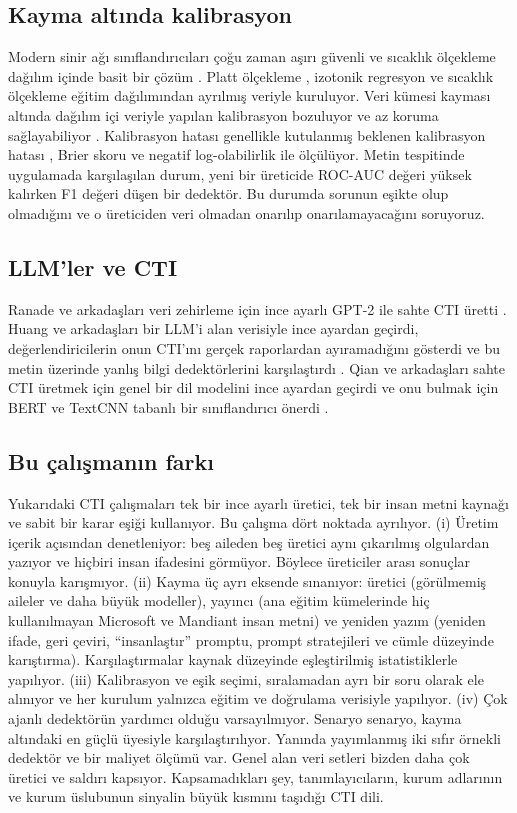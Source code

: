 \documentclass[journal]{IEEEtran}
\begin{document}
\subsection{Kayma altında kalibrasyon}
Modern sinir ağı sınıflandırıcıları çoğu zaman aşırı güvenli ve sıcaklık ölçekleme dağılım içinde basit bir çözüm
\cite{Guo_2017}. Platt ölçekleme \cite{Platt_1999}, izotonik regresyon \cite{Zadrozny_2002} ve sıcaklık ölçekleme
eğitim dağılımından ayrılmış veriyle kuruluyor. Veri kümesi kayması altında dağılım içi veriyle yapılan kalibrasyon
bozuluyor ve az koruma sağlayabiliyor \cite{Ovadia_2019}. Kalibrasyon hatası genellikle kutulanmış beklenen
kalibrasyon hatası \cite{Naeini_2015}, Brier skoru ve negatif log-olabilirlik ile ölçülüyor. Metin tespitinde
uygulamada karşılaşılan durum, yeni bir üreticide ROC-AUC değeri yüksek kalırken F1 değeri düşen bir dedektör. Bu
durumda sorunun eşikte olup olmadığını ve o üreticiden veri olmadan onarılıp onarılamayacağını soruyoruz.

\subsection{LLM'ler ve CTI}
Ranade ve arkadaşları veri zehirleme için ince ayarlı GPT-2 ile sahte CTI üretti \cite{Ranade_2021}. Huang ve
arkadaşları bir LLM'i alan verisiyle ince ayardan geçirdi, değerlendiricilerin onun CTI'ını gerçek raporlardan
ayıramadığını gösterdi ve bu metin üzerinde yanlış bilgi dedektörlerini karşılaştırdı \cite{Huang_2025}. Qian ve
arkadaşları sahte CTI üretmek için genel bir dil modelini ince ayardan geçirdi ve onu bulmak için BERT ve TextCNN
tabanlı bir sınıflandırıcı önerdi \cite{Qian_2025}.

\subsection{Bu çalışmanın farkı}
Yukarıdaki CTI çalışmaları tek bir ince ayarlı üretici, tek bir insan metni kaynağı ve sabit bir karar eşiği
kullanıyor. Bu çalışma dört noktada ayrılıyor. (i) Üretim içerik açısından denetleniyor: beş aileden beş üretici
aynı çıkarılmış olgulardan yazıyor ve hiçbiri insan ifadesini görmüyor. Böylece üreticiler arası sonuçlar konuyla
karışmıyor. (ii) Kayma üç ayrı eksende sınanıyor: üretici (görülmemiş aileler ve daha büyük modeller), yayıncı (ana
eğitim kümelerinde hiç kullanılmayan Microsoft ve Mandiant insan metni) ve yeniden yazım (yeniden ifade, geri
çeviri, ``insanlaştır'' promptu, prompt stratejileri ve cümle düzeyinde karıştırma). Karşılaştırmalar kaynak
düzeyinde eşleştirilmiş istatistiklerle yapılıyor. (iii) Kalibrasyon ve eşik seçimi, sıralamadan ayrı bir soru
olarak ele alınıyor ve her kurulum yalnızca eğitim ve doğrulama verisiyle yapılıyor. (iv) Çok ajanlı dedektörün
yardımcı olduğu varsayılmıyor. Senaryo senaryo, kayma altındaki en güçlü üyesiyle karşılaştırılıyor. Yanında
yayımlanmış iki sıfır örnekli dedektör ve bir maliyet ölçümü var. Genel alan veri setleri
\cite{Wang_2024,Dugan_2024,Wu_2024} bizden daha çok üretici ve saldırı kapsıyor. Kapsamadıkları şey,
tanımlayıcıların, kurum adlarının ve kurum üslubunun sinyalin büyük kısmını taşıdığı CTI dili.
\end{document}

